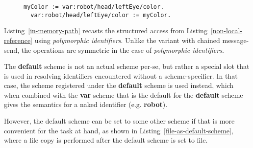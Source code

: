 \documentclass[preprint,authoryear]{acm_proc_article-sp}
\begin{document}

\begin{figure}[htbp]
\begin{lstlisting}[style=L,label=in-memory-path,caption=In-memory access path.]
  myColor := var:robot/head/leftEye/color.
  var:robot/head/leftEye/color := myColor.
\end{lstlisting}
\end{figure}

Listing~\ref{in-memory-path} recasts the structured access from 
Listing~\ref{non-local-reference} using \emph{polymorphic identifiers}.  Unlike the variant
with chained message-send, the operations are symmetric in the case of \emph{polymorphic identifiers}.

The {\bf default} scheme is not an actual scheme per-se, but rather a special slot
that is used in resolving identifiers encountered without a scheme-specifier.
In that case, the scheme registered under the {\bf default} scheme is used
instead, which when combined with the {\bf var} scheme that is the default
for the {\bf default} scheme gives the semantics for a naked identifier (e.g. {\bf robot}).

However, the default scheme can be set to some other scheme if that is more
convenient for the task at hand, as shown in Listing~\ref{file-as-default-scheme},
where a file copy is performed after the default scheme is set to file.

\end{document}
